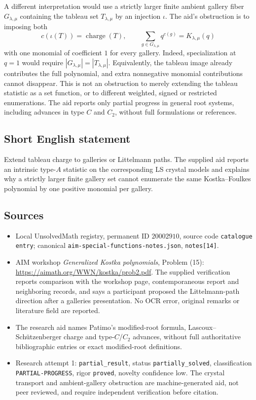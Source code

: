 \documentclass[11pt]{article}
\begin{document}
A different interpretation would use a strictly larger finite ambient gallery fiber $G_{\lambda,\mu}$ containing the tableau set $T_{\lambda,\mu}$ by an injection $\iota$. The aid's obstruction is to imposing both
\[
c(\iota(T))=\operatorname{charge}(T),\qquad
\sum_{g\in G_{\lambda,\mu}}q^{c(g)}=K_{\lambda,\mu}(q)
\]
with one monomial of coefficient $1$ for every gallery. Indeed, specialization at $q=1$ would require $|G_{\lambda,\mu}|=|T_{\lambda,\mu}|$. Equivalently, the tableau image already contributes the full polynomial, and extra nonnegative monomial contributions cannot disappear. This is not an obstruction to merely extending the tableau statistic as a set function, or to different weighted, signed or restricted enumerations. The aid reports only partial progress in general root systems, including advances in type $C$ and $C_2$, without full formulations or references.
\subsection{Short English statement}
Extend tableau charge to galleries or Littelmann paths. The supplied aid reports an intrinsic type-$A$ statistic on the corresponding LS crystal models and explains why a strictly larger finite gallery set cannot enumerate the same Kostka--Foulkes polynomial by one positive monomial per gallery.
\subsection{Sources}
\begin{itemize}
\item Local UnsolvedMath registry, permanent ID $20002910$, source code \texttt{catalogue entry}; canonical \texttt{aim-special-functions-notes.json}, \texttt{notes[14]}.
\item AIM workshop \emph{Generalized Kostka polynomials}, Problem (15): \url{https://aimath.org/WWN/kostka/prob2.pdf}. The supplied verification reports comparison with the workshop page, contemporaneous report and neighboring records, and says a participant proposed the Littelmann-path direction after a galleries presentation. No OCR error, original remarks or literature field are reported.
\item The research aid names Patimo's modified-root formula, Lascoux--Sch\"utzenberger charge and type-$C$/$C_2$ advances, without full authoritative bibliographic entries or exact modified-root definitions.
\item Research attempt 1: \texttt{partial\_result}, status \texttt{partially\_solved}, classification \texttt{PARTIAL-PROGRESS}, rigor \texttt{proved}, novelty confidence low. The crystal transport and ambient-gallery obstruction are machine-generated aid, not peer reviewed, and require independent verification before citation.
\end{itemize}
\end{document}
